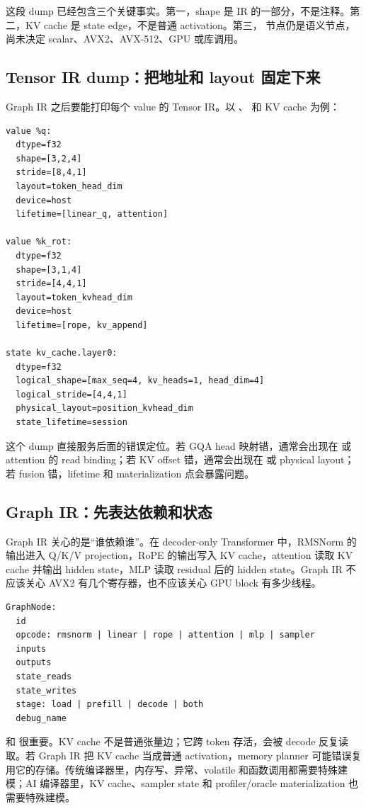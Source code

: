 这段 dump 已经包含三个关键事实。第一，shape 是 IR 的一部分，不是注释。第二，KV cache 是 state edge，不是普通 activation。第三， 节点仍是语义节点，尚未决定 scalar、AVX2、AVX-512、GPU 或库调用。

\subsection{Tensor IR dump：把地址和 layout 固定下来}

Graph IR 之后要能打印每个 value 的 Tensor IR。以 、 和 KV cache 为例：

\begin{lstlisting}[numbers=none,caption={Tensor IR dump 示例}]
value %q:
  dtype=f32
  shape=[3,2,4]
  stride=[8,4,1]
  layout=token_head_dim
  device=host
  lifetime=[linear_q, attention]

value %k_rot:
  dtype=f32
  shape=[3,1,4]
  stride=[4,4,1]
  layout=token_kvhead_dim
  device=host
  lifetime=[rope, kv_append]

state kv_cache.layer0:
  dtype=f32
  logical_shape=[max_seq=4, kv_heads=1, head_dim=4]
  logical_stride=[4,4,1]
  physical_layout=position_kvhead_dim
  state_lifetime=session
\end{lstlisting}

这个 dump 直接服务后面的错误定位。若 GQA head 映射错，通常会出现在  或 attention 的 read binding；若 KV offset 错，通常会出现在  或 physical layout；若 fusion 错，lifetime 和 materialization 点会暴露问题。

\subsection{Graph IR：先表达依赖和状态}

Graph IR 关心的是“谁依赖谁”。在 decoder-only Transformer 中，RMSNorm 的输出进入 Q/K/V projection，RoPE 的输出写入 KV cache，attention 读取 KV cache 并输出 hidden state，MLP 读取 residual 后的 hidden state。Graph IR 不应该关心 AVX2 有几个寄存器，也不应该关心 GPU block 有多少线程。

\begin{lstlisting}[numbers=none,caption={Graph IR 节点的最小字段}]
GraphNode:
  id
  opcode: rmsnorm | linear | rope | attention | mlp | sampler
  inputs
  outputs
  state_reads
  state_writes
  stage: load | prefill | decode | both
  debug_name
\end{lstlisting}

 和  很重要。KV cache 不是普通张量边；它跨 token 存活，会被 decode 反复读取。若 Graph IR 把 KV cache 当成普通 activation，memory planner 可能错误复用它的存储。传统编译器里，内存写、异常、volatile 和函数调用都需要特殊建模；AI 编译器里，KV cache、sampler state 和 profiler/oracle materialization 也需要特殊建模。

